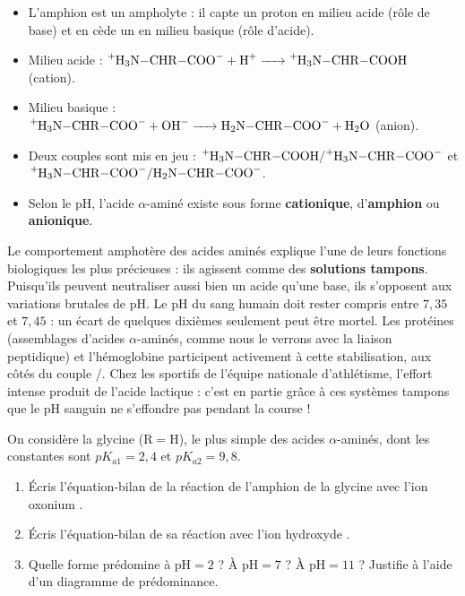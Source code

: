 \documentclass[11pt]{article}
\newcommand{\cle}[1]{{\popxbold\color{popdark}#1}}
\begin{document}
\begin{aretenir}
\begin{itemize}
\item L'amphion est un \cle{ampholyte} : il capte un proton en milieu acide (rôle de base) et en cède un en milieu basique (rôle d'acide).
\item Milieu acide : $\ce{^{+}H3N-CHR-COO- + H+ -> ^{+}H3N-CHR-COOH}$ (cation).
\item Milieu basique : $\ce{^{+}H3N-CHR-COO- + OH- -> H2N-CHR-COO- + H2O}$ (anion).
\item Deux couples sont mis en jeu : $\ce{^{+}H3N-CHR-COOH}/\ce{^{+}H3N-CHR-COO-}$ et $\ce{^{+}H3N-CHR-COO-}/\ce{H2N-CHR-COO-}$.
\item Selon le pH, l'acide $\alpha$-aminé existe sous forme \textbf{cationique}, d'\textbf{amphion} ou \textbf{anionique}.
\end{itemize}
\end{aretenir}

\begin{savaistu}
Le comportement amphotère des acides aminés explique l'une de leurs fonctions biologiques les plus précieuses : ils agissent comme des \textbf{solutions tampons}. Puisqu'ils peuvent neutraliser aussi bien un acide qu'une base, ils s'opposent aux variations brutales de pH. Le pH du sang humain doit rester compris entre $7{,}35$ et $7{,}45$ : un écart de quelques dixièmes seulement peut être mortel. Les protéines (assemblages d'acides $\alpha$-aminés, comme nous le verrons avec la liaison peptidique) et l'hémoglobine participent activement à cette stabilisation, aux côtés du couple /. Chez les sportifs de l'équipe nationale d'athlétisme, l'effort intense produit de l'acide lactique : c'est en partie grâce à ces systèmes tampons que le pH sanguin ne s'effondre pas pendant la course !
\end{savaistu}

\begin{exercice}
On considère la glycine ($\mathrm{R = H}$), le plus simple des acides $\alpha$-aminés, dont les constantes sont $pK_{a1} = 2{,}4$ et $pK_{a2} = 9{,}8$.
\begin{enumerate}
\item Écris l'équation-bilan de la réaction de l'amphion de la glycine avec l'ion oxonium .
\item Écris l'équation-bilan de sa réaction avec l'ion hydroxyde .
\item Quelle forme prédomine à $\mathrm{pH} = 2$ ? À $\mathrm{pH} = 7$ ? À $\mathrm{pH} = 11$ ? Justifie à l'aide d'un diagramme de prédominance.
\end{enumerate}
\end{exercice}
\end{document}
